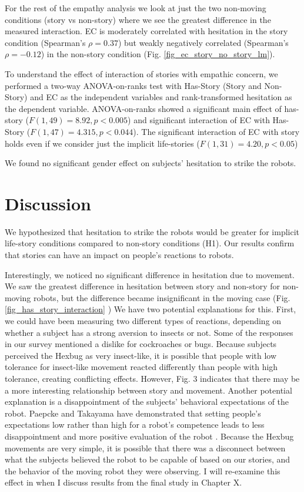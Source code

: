 For the rest of the empathy analysis we look at just the two non-moving conditions (story vs non-story) where we see the greatest difference in the measured interaction. EC is moderately correlated with hesitation in the story condition (Spearman's $\rho=0.37$)  but weakly negatively correlated  (Spearman's $\rho=-0.12$) in the non-story condition (Fig. \ref{fig_ec_story_no_story_lm}).

To understand the effect of interaction of stories with empathic concern, we performed a two-way ANOVA-on-ranks test with Has-Story (Story and Non-Story) and EC as the independent variables and rank-transformed hesitation as the dependent variable. ANOVA-on-ranks showed a significant main effect of has-story ($F(1, 49)=8.92, p < 0.005$) and significant interaction of EC with Has-Story ($F(1, 47)=4.315, p < 0.044$). The significant interaction of EC with story holds even if we consider just the implicit life-stories ($F(1, 31) = 4.20, p < 0.05$)

We found no significant gender effect on subjects' hesitation to strike the robots.

\section{Discussion}
\label{sec_hexbug_discussion}

We hypothesized that hesitation to strike the robots would be greater for implicit life-story conditions compared to non-story conditions (H1). Our results confirm that stories can have an impact on people's reactions to robots. 

Interestingly, we noticed no significant difference in hesitation due to movement. We saw the greatest difference in hesitation between story and non-story for non-moving robots, but the difference became insignificant in the moving case (Fig. \ref{fig_has_story_interaction} ) We have two potential explanations for this. First, we could have been measuring two different types of reactions, depending on whether a subject has a strong aversion to insects or not. Some of the responses in our survey mentioned a dislike for cockroaches or bugs. Because subjects perceived the Hexbug as very insect-like, it is possible that people with low tolerance for insect-like movement reacted differently than people with high tolerance, creating conflicting effects. However, Fig. 3 indicates that there may be a more interesting relationship between story and movement. Another potential explanation is a disappointment of the subjects' behavioral expectations of the robot. Paepcke and Takayama have demonstrated that setting people's expectations low rather than high for a robot's competence leads to less disappointment and more positive evaluation of the robot \cite{paepcke_robot_low_expectations}. Because the Hexbug movements are very simple, it is possible that there was a disconnect between what the subjects believed the robot to be capable of based on our stories, and the behavior of the moving robot they were observing. I will re-examine this effect in when I discuss results from the final study in Chapter X. 

